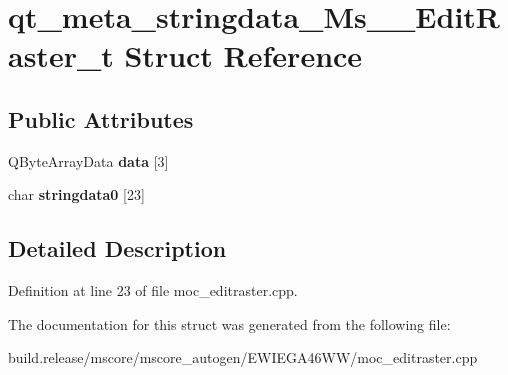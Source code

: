 \hypertarget{structqt__meta__stringdata___ms_____edit_raster__t}{}\section{qt\+\_\+meta\+\_\+stringdata\+\_\+\+Ms\+\_\+\+\_\+\+Edit\+Raster\+\_\+t Struct Reference}
\label{structqt__meta__stringdata___ms_____edit_raster__t}
\subsection*{Public Attributes}
\begin{DoxyCompactItemize}
\item 
\mbox{\label{structqt__meta__stringdata___ms_____edit_raster__t_a25b7977fc6bff4ff3c9a0206ddbb62a9}} 
Q\+Byte\+Array\+Data {\bfseries data} \mbox{[}3\mbox{]}
\item 
\mbox{\label{structqt__meta__stringdata___ms_____edit_raster__t_ae05a979d216268711355ebb010c45163}} 
char {\bfseries stringdata0} \mbox{[}23\mbox{]}
\end{DoxyCompactItemize}


\subsection{Detailed Description}


Definition at line 23 of file moc\+\_\+editraster.\+cpp.



The documentation for this struct was generated from the following file\+:\begin{DoxyCompactItemize}
\item 
build.\+release/mscore/mscore\+\_\+autogen/\+E\+W\+I\+E\+G\+A46\+W\+W/moc\+\_\+editraster.\+cpp\end{DoxyCompactItemize}
